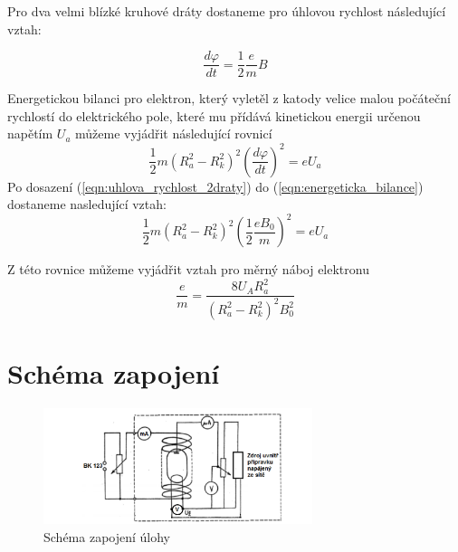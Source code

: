\documentclass{praktikum}
\begin{document}
Pro dva velmi blízké kruhové dráty dostaneme pro úhlovou rychlost následující vztah:

\begin{equation}
\label{eqn:uhlova_rychlost_2draty}
\dfrac{d\varphi}{dt}=\dfrac{1}{2}\dfrac{e}{m}B
\end{equation}

Energetickou bilanci pro elektron, který vyletěl z katody velice malou počáteční rychlostí do elektrického pole, které mu přídává kinetickou energii určenou napětím $U_a$ můžeme vyjádřit následující rovnicí
\begin{equation}
\label{eqn:energeticka_bilance}
\dfrac{1}{2}m(R_a^2-R_k^2)^2\left(\dfrac{d\varphi}{dt}\right)^2=eU_a
\end{equation}
\indent Po dosazení (\ref{eqn:uhlova_rychlost_2draty}) do (\ref{eqn:energeticka_bilance}) dostaneme nasledující vztah:
\begin{equation}
\label{eqn:energeticka_bilance_dosazeni}
\dfrac{1}{2}m(R_a^2-R_k^2)^2\left(\dfrac{1}{2}\dfrac{eB_0}{m}\right)^2=eU_a
\end{equation}

Z této rovnice můžeme vyjádřit vztah pro měrný náboj elektronu
\begin{equation}
\label{eqn:merny_naboj}
\dfrac{e}{m}=\dfrac{8U_AR_a^2}{\left(R_a^2-R_k^2\right)^2B_0^2}
\end{equation}

\section{Schéma zapojení}
\begin{figure}[H]
\centering
\caption{Schéma zapojení úlohy}
\label{img:schema}
\includegraphics[width=0.7\textwidth]{schema}
\end{figure}
\end{document}
